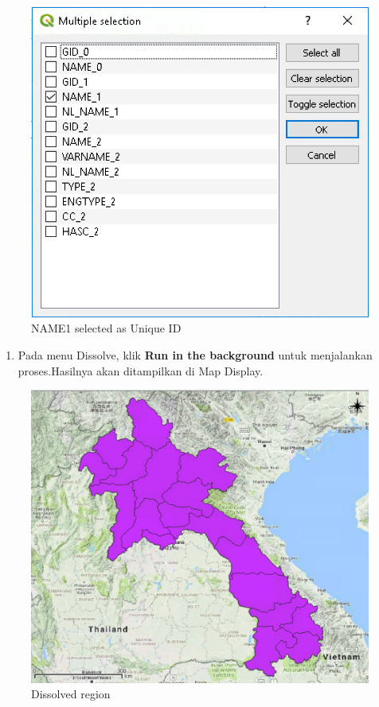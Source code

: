 \documentclass[]{book}
\providecommand{\tightlist}{%
  \setlength{\itemsep}{0pt}\setlength{\parskip}{0pt}}
\begin{document}
\begin{figure}

{\centering \includegraphics[width=0.6\linewidth]{images/04/fig20} 

}

\caption{NAME1 selected as Unique ID}\label{fig:fig1420}
\end{figure}

\begin{enumerate}
\def\labelenumi{\arabic{enumi}.}
\setcounter{enumi}{3}
\tightlist
\item
  Pada menu Dissolve, klik \textbf{Run in the background} untuk menjalankan proses.Hasilnya akan ditampilkan di Map Display.
\end{enumerate}

\begin{figure}

{\centering \includegraphics[width=0.7\linewidth]{images/04/fig21} 

}

\caption{Dissolved region}\label{fig:fig1421}
\end{figure}
\end{document}
